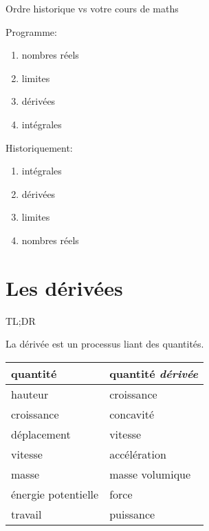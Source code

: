\documentclass{beamer}
\begin{document}
\begin{frame}
    {Ordre historique vs votre cours de maths}

    Programme:
    \begin{enumerate}
        \item nombres réels
        \item limites
        \item dérivées
        \item intégrales
    \end{enumerate}
    \pause{}

    Historiquement:
    \begin{enumerate}
        \item intégrales
            \pause{}
        \item dérivées
            \pause{}
        \item limites
            \pause{}
        \item nombres réels
    \end{enumerate}
\end{frame}

\section{Les dérivées}

\begin{frame}
    {TL;DR}

    La dérivée est un processus liant des quantités.
    \pause{}

    \begin{center}
        \begin{tabular}
            {|l|l|}

            \toprule
            quantité & quantité \emph{dérivée}\\
            \midrule

            hauteur & croissance\\
            croissance & concavité\\
            déplacement & vitesse\\
            vitesse & accélération\\
            masse & masse volumique\\
            énergie potentielle & force\\
            travail & puissance\\
            \bottomrule
        \end{tabular}
    \end{center}
\end{frame}
\end{document}

